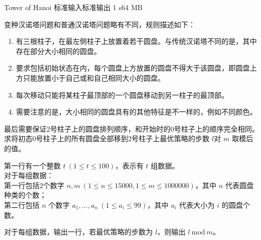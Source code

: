 \gdef\thisproblemauthor{Voleking}
\begin{problem}{Tower of Hanoi}
{标准输入}{标准输出}
{1 s}{64 MB}{}

变种汉诺塔问题和普通汉诺塔问题略有不同，规则描述如下：
\begin{enumerate}
  \item 有三根柱子，在最左侧柱子上放置着若干圆盘。与传统汉诺塔不同的是，其中存在部分大小相同的圆盘。
  \item 要求包括初始状态在内，每个圆盘上方放置的圆盘不得大于该圆盘，即圆盘上方只能放置小于自己或和自己相同大小的圆盘。
  \item 每次移动只能将某柱子最顶部的一个圆盘移动到另一柱子的最顶部。
  \item 需要注意的是，大小相同的圆盘具有的其他特征是不一样的，例如不同颜色。
\end{enumerate}
最后需要保证2号柱子上的圆盘排列顺序，和开始时的0号柱子上的顺序完全相同。\\
求将初态0号柱子上的所有圆盘全部移到2号柱子上最优策略的步数 $l$对 $m$ 取模后的值。\\

\InputFile

第一行有一个整数 $t\ (1 \le t \le 100)$，表示有 $t$ 组数据。\\
对于每组数据：\\
第一行包括2个数字 $n,m\ (1\le n\le 15000,1\le m\le 1000000)$，其中 $n$ 代表圆盘种类的个数；\\
第二行包括 $n$ 个数字 $a_1,…,a_n\ (1\le a_i\le 99)$，其中 $a_i$ 代表大小为 $i$ 的圆盘个数。

\OutputFile

对于每组数据，输出一行，若最优策略的步数为 $l$，则输出 $l\ \text{mod}\ m$。

\Examples

\begin{example}
%
\end{example}

\end{problem}
